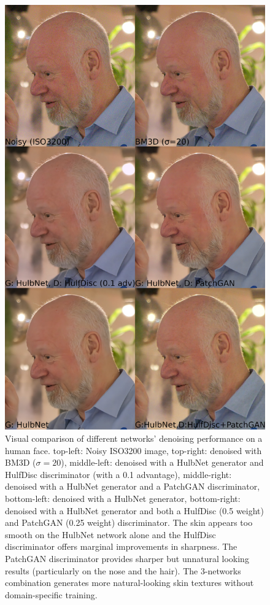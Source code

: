 \begin{figure}[!htbp]
\centering
\includegraphics[width=1\linewidth,height=0.75\textheight,keepaspectratio]{gfx/comp/face.jpg}
\caption[Denoising a face with cGANs (visual comparison)]{Visual comparison of different networks' denoising performance on a human face. top-left: Noisy ISO3200 image, top-right: denoised with \ac{BM3D} ($\sigma = 20$), middle-left: denoised with a HulbNet generator and HulfDisc discriminator (with a 0.1 advantage), middle-right: denoised with a HulbNet generator and a PatchGAN discriminator, bottom-left: denoised with a HulbNet generator, bottom-right: denoised with a HulbNet generator and both a HulfDisc (0.5 weight) and PatchGAN (0.25 weight) discriminator. The skin appears too smooth on the HulbNet network alone and the HulfDisc discriminator offers marginal improvements in sharpness. The PatchGAN discriminator provides sharper but unnatural looking results (particularly on the nose and the hair). The 3-networks combination generates more natural-looking skin textures without domain-specific training.}
\label{fig:skin}
\end{figure}

